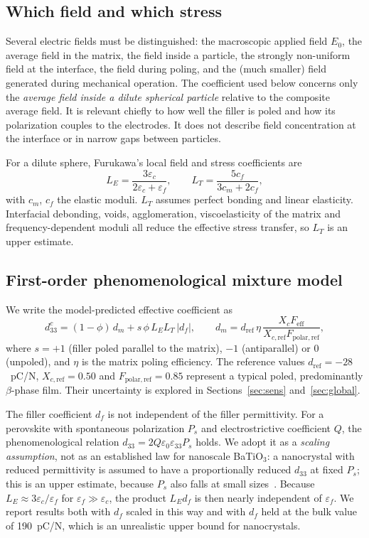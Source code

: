 \documentclass[11pt,a4paper]{article}
\newcommand{\BTO}{BaTiO$_3$}
\newcommand{\dt}{d_{33}}
\begin{document}
\subsection{Which field and which stress}
Several electric fields must be distinguished: the macroscopic applied field $E_0$, the average field in the matrix, the field inside a particle, the strongly non-uniform field at the interface, the field during poling, and the (much smaller) field generated during mechanical operation. The coefficient used below concerns only the \emph{average field inside a dilute spherical particle} relative to the composite average field. It is relevant chiefly to how well the filler is poled and how its polarization couples to the electrodes. It does not describe field concentration at the interface or in narrow gaps between particles.

For a dilute sphere, Furukawa's local field and stress coefficients are~\cite{Furukawa1989}
\begin{equation}
L_E=\frac{3\varepsilon_c}{2\varepsilon_c+\varepsilon_f},\qquad L_T=\frac{5c_f}{3c_m+2c_f},
\end{equation}
with $c_m$, $c_f$ the elastic moduli. $L_T$ assumes perfect bonding and linear elasticity. Interfacial debonding, voids, agglomeration, viscoelasticity of the matrix and frequency-dependent moduli all reduce the effective stress transfer, so $L_T$ is an upper estimate.

\subsection{First-order phenomenological mixture model}
We write the model-predicted effective coefficient as
\begin{equation}
\dt^{c}=(1-\phi)\,d_m+s\,\phi\,L_EL_T\,|d_f|,\qquad
d_m=d_{\mathrm{ref}}\,\eta\,\frac{X_cF_{\mathrm{eff}}}{X_{c,\mathrm{ref}}F_{\mathrm{polar,ref}}},
\label{eq:d33}
\end{equation}
where $s=+1$ (filler poled parallel to the matrix), $-1$ (antiparallel) or 0 (unpoled), and $\eta$ is the matrix poling efficiency. The reference values $d_{\mathrm{ref}}=-28$~pC/N, $X_{c,\mathrm{ref}}=0.50$ and $F_{\mathrm{polar,ref}}=0.85$ represent a typical poled, predominantly $\beta$-phase film. Their uncertainty is explored in Sections~\ref{sec:sens} and~\ref{sec:global}.

The filler coefficient $d_f$ is not independent of the filler permittivity. For a perovskite with spontaneous polarization $P_s$ and electrostrictive coefficient $Q$, the phenomenological relation $d_{33}=2Q\varepsilon_0\varepsilon_{33}P_s$ holds. We adopt it as a \emph{scaling assumption}, not as an established law for nanoscale \BTO{}: a nanocrystal with reduced permittivity is assumed to have a proportionally reduced $\dt$ at fixed $P_s$; this is an upper estimate, because $P_s$ also falls at small sizes~\cite{Hoshina2008}. Because $L_E\approx3\varepsilon_c/\varepsilon_f$ for $\varepsilon_f\gg\varepsilon_c$, the product $L_Ed_f$ is then nearly independent of $\varepsilon_f$. We report results both with $d_f$ scaled in this way and with $d_f$ held at the bulk value of 190~pC/N, which is an unrealistic upper bound for nanocrystals.
\end{document}
